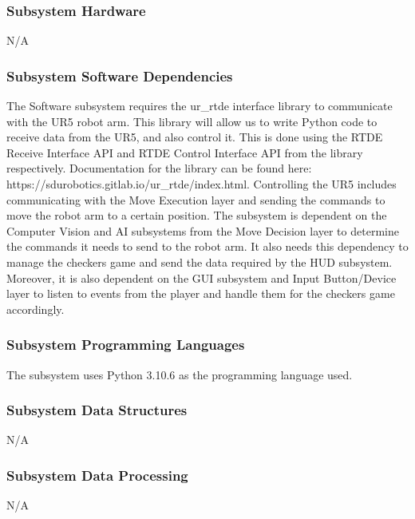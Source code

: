 \subsubsection{Subsystem Hardware}
N/A


\subsubsection{Subsystem Software Dependencies}
The Software subsystem requires the ur\_rtde interface library to communicate with the UR5 robot arm. This library will allow us to write Python code to receive data from the UR5, and also control it. This is done using the RTDE Receive Interface API and RTDE Control Interface API from the library respectively. Documentation for the library can be found here: https://sdurobotics.gitlab.io/ur\_rtde/index.html. Controlling the UR5 includes communicating with the Move Execution layer and sending the commands to move the robot arm to a certain position. The subsystem is dependent on the Computer Vision and AI subsystems from the Move Decision layer to determine the commands it needs to send to the robot arm. It also needs this dependency to manage the checkers game and send the data required by the HUD subsystem. Moreover, it is also dependent on the GUI subsystem and Input Button/Device layer to listen to events from the player and handle them for the checkers game accordingly.


\subsubsection{Subsystem Programming Languages}
The subsystem uses Python 3.10.6 as the programming language used.

\subsubsection{Subsystem Data Structures}
N/A

\subsubsection{Subsystem Data Processing}
N/A